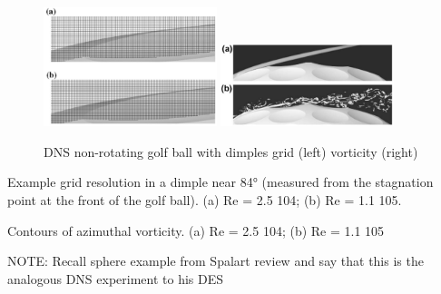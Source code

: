 \documentclass[journal]{new-aiaa}
\begin{document}
\begin{figure}[H]
\begin{center}
\includegraphics[width=0.45\textwidth]{Images/logan/smith2010numerical_golfballgrid.pdf}
\includegraphics[width=0.45\textwidth]{Images/logan/smith2010numerical_golfballvorticity.pdf}
\caption{ DNS non-rotating golf ball with dimples grid (left) vorticity (right) \cite{smith2010numerical} }
\label{fig:dnsgolfball}
\end{center}
\end{figure}


Example grid resolution in a dimple near 84° (measured from the stagnation point at the front of the golf ball). (a) Re = 2.5   104; (b) Re = 1.1   105.

Contours of azimuthal vorticity. (a) Re = 2.5   104; (b) Re = 1.1   105

NOTE: Recall sphere example from Spalart review and say that this is the analogous DNS experiment to his DES
\end{document}
